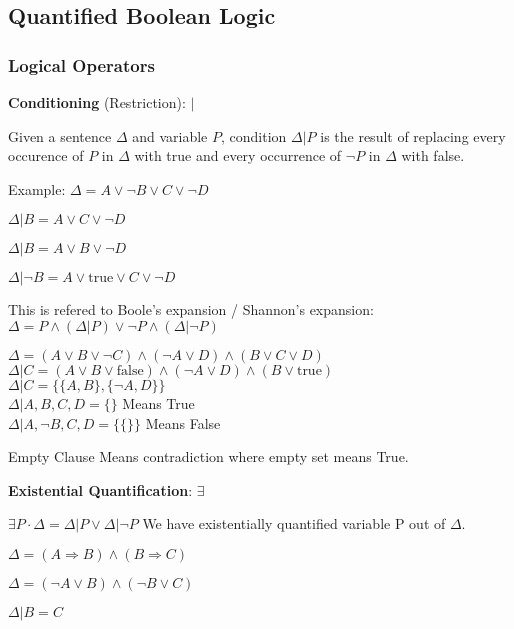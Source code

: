 \documentclass[11pt]{article}
\begin{document}
\subsection{Quantified Boolean Logic}
\subsubsection{Logical Operators}
\vspace{1em}

\textbf{Conditioning} (Restriction): $|$

Given a sentence $\Delta$ and variable $P$, condition $\Delta | P$ is the result of replacing every occurence of $P$ in $\Delta$ with true and every occurrence of $\neg P$ in $\Delta$ with false.

Example: $\Delta = A \lor \neg B \lor C \lor \neg D$

$\Delta | B = A \lor C \lor \neg D$

$\Delta | B = A \lor B \lor \neg D$

$\Delta | \neg B = A \lor \text{true} \lor C \lor \neg D$

This is refered to Boole's expansion / Shannon's expansion: $\Delta = P \land (\Delta | P) \lor \neg P \land (\Delta | \neg P)$
\vspace{1em}

$\Delta = (A \lor B \lor \neg C) \land (\neg A \lor D) \land (B \lor C \lor D)$\\
$\Delta | C = (A \lor B \lor \text{false}) \land (\neg A \lor D) \land (B \lor \text{true})$\\
$\Delta | C = \{\{A, B\}, \{\neg A, D\}\}$\\
$\Delta | A,B,C,D = \{\}$ Means True\\
$\Delta | A,\neg B,C,D = \{\{\}\}$ Means False
\vspace{1em}

Empty Clause Means contradiction where empty set means True.
\vspace{1em}


\textbf{Existential Quantification}: $\exists$
\vspace{1em}

$\exists P \cdot \Delta = \Delta | P \lor \Delta | \neg P$ We have existentially quantified variable P out of $\Delta$.

$\Delta = (A \Rightarrow B) \land (B \Rightarrow C)$

$\Delta = (\neg A \lor B) \land (\neg B \lor C)$

$\Delta | B = C$ 
\end{document}
